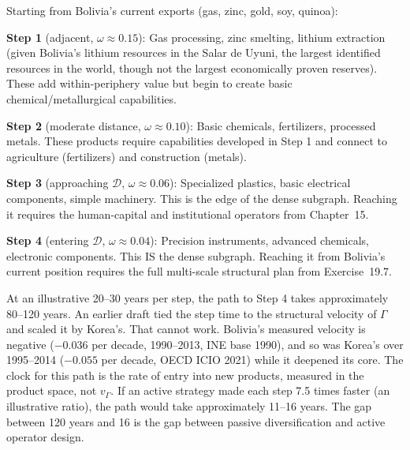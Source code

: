 \documentclass[../structural_economics_book.tex]{subfiles}
\begin{document}
\begin{example}\label{ch25:ex:bolivia_path}
Starting from Bolivia's current exports (gas, zinc, gold, soy, quinoa):

\textbf{Step 1} (adjacent, $\omega \approx 0.15$): Gas processing, zinc smelting, lithium extraction (given Bolivia's lithium resources in the Salar de Uyuni, the largest identified resources in the world, though not the largest economically proven reserves). These add within-periphery value but begin to create basic chemical/metallurgical capabilities.

\textbf{Step 2} (moderate distance, $\omega \approx 0.10$): Basic chemicals, fertilizers, processed metals. These products require capabilities developed in Step 1 and connect to agriculture (fertilizers) and construction (metals).

\textbf{Step 3} (approaching $\mathcal{D}$, $\omega \approx 0.06$): Specialized plastics, basic electrical components, simple machinery. This is the edge of the dense subgraph. Reaching it requires the human-capital and institutional operators from Chapter~15.

\textbf{Step 4} (entering $\mathcal{D}$, $\omega \approx 0.04$): Precision instruments, advanced chemicals, electronic components. This IS the dense subgraph. Reaching it from Bolivia's current position requires the full multi-scale structural plan from Exercise~19.7.

At an illustrative 20--30 years per step, the path to Step 4 takes approximately 80--120 years. An earlier draft tied the step time to the structural velocity of $\Gamma$ and scaled it by Korea's. That cannot work. Bolivia's measured velocity is negative ($-0.036$ per decade, 1990--2013, INE base 1990), and so was Korea's over 1995--2014 ($-0.055$ per decade, OECD ICIO 2021) while it deepened its core. The clock for this path is the rate of entry into new products, measured in the product space, not $v_\Gamma$. If an active strategy made each step 7.5 times faster (an illustrative ratio), the path would take approximately 11--16 years. The gap between 120 years and 16 is the gap between passive diversification and active operator design.
\end{example}
\end{document}
